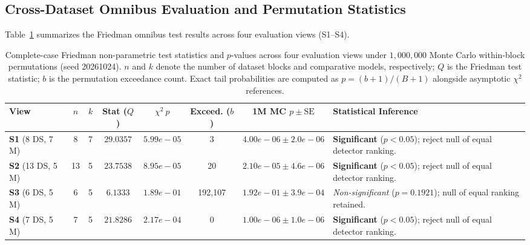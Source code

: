 \documentclass[applsci,article,submit,moreauthors,pdftex]{Definitions/mdpi}
\begin{document}
\subsection{Cross-Dataset Omnibus Evaluation and Permutation Statistics}
Table~\ref{tab:friedman_stats} summarizes the Friedman omnibus test results across four evaluation views (S1--S4).

\begin{table}[htbp]
\centering\footnotesize\setlength{\tabcolsep}{2.5pt}
\caption{Complete-case Friedman non-parametric test statistics and $p$-values across four evaluation views under $1{,}000{,}000$ Monte Carlo within-block permutations (seed 20261024). $n$ and $k$ denote the number of dataset blocks and comparative models, respectively; $Q$ is the Friedman test statistic; $b$ is the permutation exceedance count. Exact tail probabilities are computed as $p = (b+1)/(B+1)$ alongside asymptotic $\chi^2$ references.}
\label{tab:friedman_stats}
\begin{tabularx}{\textwidth}{lcccccc>{\raggedright\arraybackslash}X}\toprule
\textbf{View} & \textbf{$n$} & \textbf{$k$} & \textbf{Stat ($Q$)} & $\chi^2\ p$ & \textbf{Exceed. ($b$)} & \textbf{1M MC $p \pm \text{SE}$} & \textbf{Statistical Inference} \\\midrule
\textbf{S1} (8 DS, 7 M) & 8 & 7 & $29.0357$ & $5.99e-05$ & 3 & $4.00e-06 \pm 2.0e-06$ & \textbf{Significant} ($p < 0.05$); reject null of equal detector ranking. \\
\textbf{S2} (13 DS, 5 M) & 13 & 5 & $23.7538$ & $8.95e-05$ & 20 & $2.10e-05 \pm 4.6e-06$ & \textbf{Significant} ($p < 0.05$); reject null of equal detector ranking. \\
\textbf{S3} (6 DS, 5 M) & 6 & 5 & $6.1333$ & $1.89e-01$ & 192,107 & $1.92e-01 \pm 3.9e-04$ & \textit{Non-significant} ($p = 0.1921$); null of equal ranking retained. \\
\textbf{S4} (7 DS, 5 M) & 7 & 5 & $21.8286$ & $2.17e-04$ & 0 & $1.00e-06 \pm 1.0e-06$ & \textbf{Significant} ($p < 0.05$); reject null of equal detector ranking. \\
\bottomrule
\end{tabularx}
\end{table}
\end{document}
